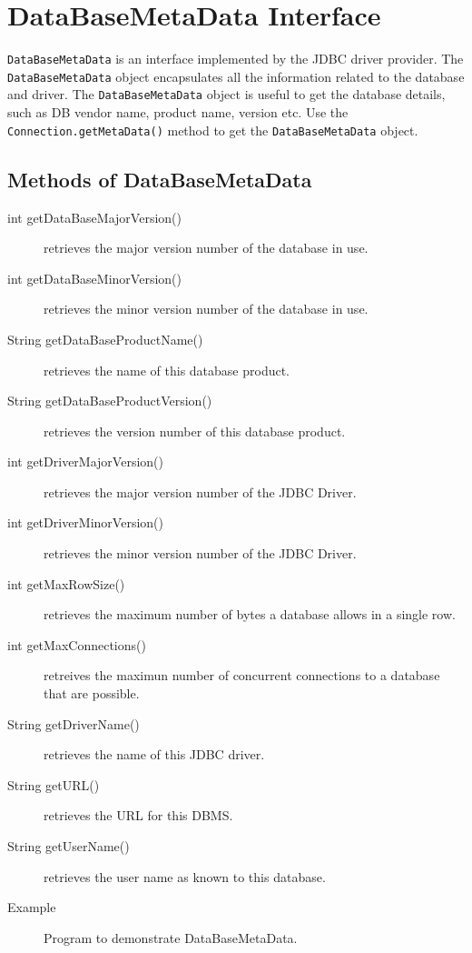 \documentclass[11pt,a4paper]{article}
\begin{document}
\section*{DataBaseMetaData Interface}
\texttt{DataBaseMetaData} is an interface implemented by the JDBC driver provider. The \texttt{DataBaseMetaData} object encapsulates all the information related to the database and driver. The \texttt{DataBaseMetaData} object is useful to get the database details, such as DB vendor name, product name, version etc. Use the \texttt{Connection.getMetaData()} method to get the \texttt{DataBaseMetaData} object.

\subsection*{Methods of DataBaseMetaData}
\begin{description}
    \item[int getDataBaseMajorVersion()] retrieves the major version number of the database in use.
    \item[int getDataBaseMinorVersion()] retrieves the minor version number of the database in use.
    \item[String getDataBaseProductName()] retrieves the name of this database product.
    \item[String getDataBaseProductVersion()] retrieves the version number of this database product.
    \item[int getDriverMajorVersion()] retrieves the major version number of the JDBC Driver.
    \item[int getDriverMinorVersion()] retrieves the minor version number of the JDBC Driver.
    \item[int getMaxRowSize()] retrieves the maximum number of bytes a database allows in a single row.
    \item[int getMaxConnections()] retreives the maximun number of concurrent connections to a database that are possible.
    \item[String getDriverName()] retrieves the name of this JDBC driver.
    \item[String getURL()] retrieves the URL for this DBMS.
    \item[String getUserName()] retrieves the user name as known to this database.
\end{description}

\begin{description}
    \item[Example] Program to demonstrate DataBaseMetaData.
    
\end{description}
\end{document}
